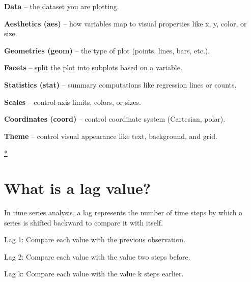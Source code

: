 \documentclass[
  11pt,
  a4paper,
]{report}
\begin{document}
\textbf{Data} -- the dataset you are plotting.

\textbf{Aesthetics (aes)} -- how variables map to visual properties like
x, y, color, or size.

\textbf{Geometries (geom)} -- the type of plot (points, lines, bars,
etc.).

\textbf{Facets} -- split the plot into subplots based on a variable.

\textbf{Statistics (stat)} -- summary computations like regression lines
or counts.

\textbf{Scales} -- control axis limits, colors, or sizes.

\textbf{Coordinates (coord)} -- control coordinate system (Cartesian,
polar).

\textbf{Theme} -- control visual appearance like text, background, and
grid.

\href{https://thiyangt.github.io/spts_python_practical/Practical1/}{*}

\section{What is a lag value?}\label{what-is-a-lag-value}

In time series analysis, a lag represents the number of time steps by
which a series is shifted backward to compare it with itself.

Lag 1: Compare each value with the previous observation.

Lag 2: Compare each value with the value two steps before.

Lag k: Compare each value with the value k steps earlier.
\end{document}
